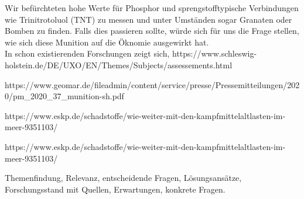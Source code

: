 Wir befürchteten hohe Werte für Phosphor und sprengstofftypische Verbindungen wie Trinitrotoluol (TNT) 
zu messen und unter Umständen sogar Granaten oder Bomben zu finden. Falls dies passieren sollte, würde 
sich für uns die Frage stellen, wie sich diese Munition auf die Öknomie ausgewirkt hat. \\

In schon existierenden Forschungen zeigt sich, 
https://www.schleswig-holstein.de/DE/UXO/EN/Themes/Subjects/assessements.html

https://www.geomar.de/fileadmin/content/service/presse/Pressemitteilungen/2020/pm_2020_37_munition-sh.pdf

https://www.eskp.de/schadstoffe/wie-weiter-mit-den-kampfmittelaltlasten-im-meer-9351103/

https://www.eskp.de/schadstoffe/wie-weiter-mit-den-kampfmittelaltlasten-im-meer-9351103/

Themenfindung, Relevanz, entscheidende Fragen, Lösungsansätze, Forschungsstand mit Quellen, Erwartungen, konkrete Fragen.
